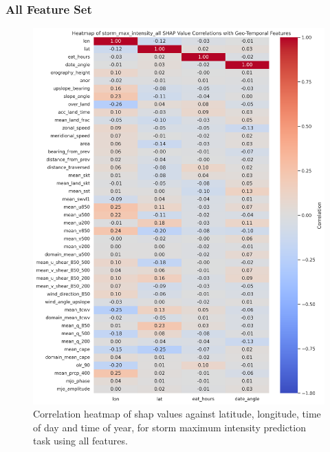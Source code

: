 \subsubsection{All Feature Set}
\begin{figure}[ht]
    \centering
    \includegraphics[width=\textwidth]{../figures/generated/experiments/storm_max_intensity/storm_max_intensity_all_shap_correlation_heatmap.png}
    \caption{Correlation heatmap of \acrshort{shap} values against latitude, longitude, time of day and time of year, for storm maximum intensity prediction task using all features.}
    \label{fig:storm_max_intensity_all_shap_heatmap}
\end{figure}


